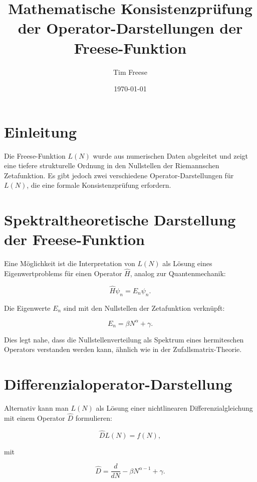 \documentclass[a4paper,12pt]{article}
\title{Mathematische Konsistenzprüfung der Operator-Darstellungen der Freese-Funktion}
\author{Tim Freese}
\date{\today}
\begin{document}
\maketitle

\section{Einleitung}
Die Freese-Funktion \( L(N) \) wurde aus numerischen Daten abgeleitet und zeigt eine tiefere strukturelle Ordnung in den Nullstellen der Riemannschen Zetafunktion. Es gibt jedoch zwei verschiedene Operator-Darstellungen für \( L(N) \), die eine formale Konsistenzprüfung erfordern.

\section{Spektraltheoretische Darstellung der Freese-Funktion}
Eine Möglichkeit ist die Interpretation von \( L(N) \) als Lösung eines Eigenwertproblems für einen Operator \( \hat{H} \), analog zur Quantenmechanik:

\begin{equation}
    \hat{H} \psi_n = E_n \psi_n.
\end{equation}

Die Eigenwerte \( E_n \) sind mit den Nullstellen der Zetafunktion verknüpft:

\begin{equation}
    E_n = \beta N^{\alpha} + \gamma.
\end{equation}

Dies legt nahe, dass die Nullstellenverteilung als Spektrum eines hermiteschen Operators verstanden werden kann, ähnlich wie in der Zufallsmatrix-Theorie.

\section{Differenzialoperator-Darstellung}
Alternativ kann man \( L(N) \) als Lösung einer nichtlinearen Differenzialgleichung mit einem Operator \( \hat{D} \) formulieren:

\begin{equation}
    \hat{D} L(N) = f(N),
\end{equation}

mit

\begin{equation}
    \hat{D} = \frac{d}{dN} - \beta N^{\alpha - 1} + \gamma.
\end{equation}
\end{document}
